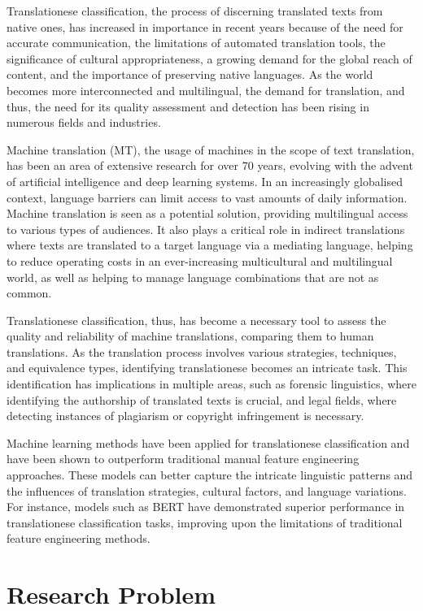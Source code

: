 Translationese classification, the process of discerning translated texts from native ones, has increased in importance in recent years because of the need for accurate communication, the limitations of automated translation tools, the significance of cultural appropriateness, a growing demand for the global reach of content, and the importance of preserving native languages. As the world becomes more interconnected and multilingual, the demand for translation, and thus, the need for its quality assessment and detection has been rising in numerous fields and industries.

Machine translation (MT)\cite{background}, the usage of machines in the scope of text translation, has been an area of extensive research for over 70 years, evolving with the advent of artificial intelligence and deep learning systems. In an increasingly globalised context, language barriers can limit access to vast amounts of daily information. Machine translation is seen as a potential solution, providing multilingual access to various types of audiences. It also plays a critical role in indirect translations where texts are translated to a target language via a mediating language, helping to reduce operating costs in an ever-increasing multicultural and multilingual world, as well as helping to manage language combinations that are not as common.

Translationese classification, thus, has become a necessary tool to assess the quality and reliability of machine translations, comparing them to human translations. As the translation process involves various strategies, techniques, and equivalence types, identifying translationese becomes an intricate task. This identification has implications in multiple areas, such as forensic linguistics, where identifying the authorship of translated texts is crucial, and legal fields, where detecting instances of plagiarism or copyright infringement is necessary.

Machine learning methods have been applied for translationese classification and have been shown to outperform traditional manual feature engineering approaches. These models can better capture the intricate linguistic patterns and the influences of translation strategies, cultural factors, and language variations. For instance, models such as BERT have demonstrated superior performance in translationese classification tasks, improving upon the limitations of traditional feature engineering methods.

\section{Research Problem}

